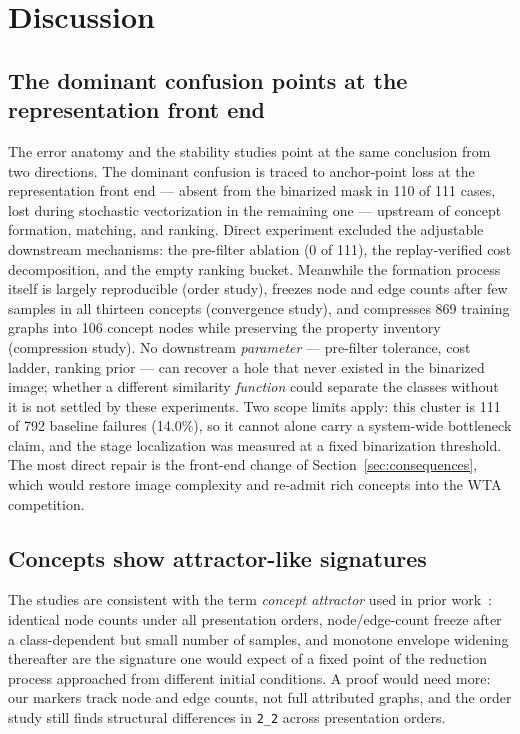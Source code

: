 \documentclass[conference]{IEEEtran}
\newcommand{\cid}[1]{\texttt{#1}}   %
\begin{document}
\section{Discussion}
\label{sec:discussion}

\subsection{The dominant confusion points at the representation front end}

The error anatomy and the stability studies point at the same conclusion
from two directions. The dominant confusion is traced to
anchor-point loss at the representation front end --- absent from the
binarized mask in 110 of 111 cases, lost during stochastic vectorization
in the remaining one --- upstream of concept formation, matching, and
ranking. Direct experiment
excluded the adjustable downstream mechanisms: the pre-filter ablation
(0 of 111), the replay-verified cost decomposition, and the empty ranking
bucket.
Meanwhile the formation process itself is largely reproducible (order
study), freezes node and edge counts after few samples in all
thirteen concepts (convergence study), and compresses 869
training graphs into 106 concept nodes while preserving the property
inventory (compression study). No downstream \emph{parameter} ---
pre-filter
tolerance, cost ladder, ranking prior --- can recover a hole that never
existed in the binarized image; whether a different similarity
\emph{function} could separate the classes without it is not settled by
these experiments. Two scope limits apply: this cluster is 111 of 792
baseline failures (14.0\%), so it cannot alone carry a system-wide
bottleneck claim, and the stage localization was measured at a fixed
binarization threshold. The most direct repair is the front-end
change of Section~\ref{sec:consequences}, which would restore image
complexity and re-admit rich concepts into the WTA competition.

\subsection{Concepts show attractor-like signatures}

The studies are consistent with the term \emph{concept attractor} used in
prior work~\cite{lapin2025fewshot}: identical node counts under all
presentation orders, node/edge-count freeze after a class-dependent but
small number of samples, and monotone envelope widening thereafter are
the signature one would expect of a fixed point of the reduction process
approached from different initial conditions. A proof would need more: our
markers track node and edge counts, not full attributed graphs, and the
order study still finds structural differences in \cid{2\_2} across
presentation orders.
\end{document}
